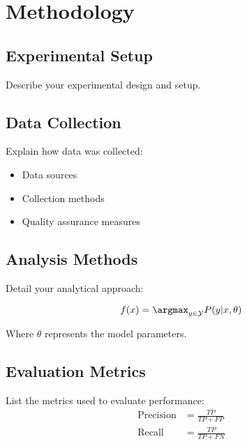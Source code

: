 
\section{Methodology}

\subsection{Experimental Setup}
Describe your experimental design and setup.

\subsection{Data Collection}
Explain how data was collected:
\begin{itemize}
    \item Data sources
    \item Collection methods
    \item Quality assurance measures
\end{itemize}

\subsection{Analysis Methods}
Detail your analytical approach:

\begin{equation}
    f(x) = \argmax_{y \in \mathcal{Y}} P(y|x, \theta)
\end{equation}

Where $\theta$ represents the model parameters.

\subsection{Evaluation Metrics}
List the metrics used to evaluate performance:
\begin{align}
    \text{Precision} &= \frac{TP}{TP + FP} \\
    \text{Recall} &= \frac{TP}{TP + FN}
\end{align} 